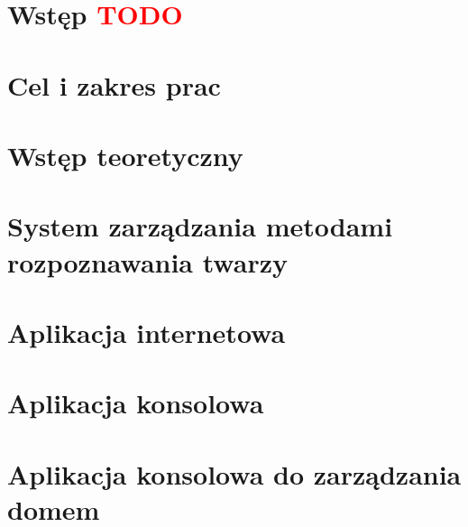 \documentclass[11pt, a4paper,polish,twoside]{report}
\begin{document}



\newpage
\null
\thispagestyle{empty}
\newpage
%



\tableofcontents

\chapter{Wstęp \textcolor{red}{TODO}}


\chapter{Cel i zakres prac}


\chapter{Wstęp teoretyczny}


\chapter{System zarządzania metodami rozpoznawania twarzy}


\chapter{Aplikacja internetowa}


\chapter{Aplikacja konsolowa}


\chapter{Aplikacja konsolowa do zarządzania domem}

\end{document}
